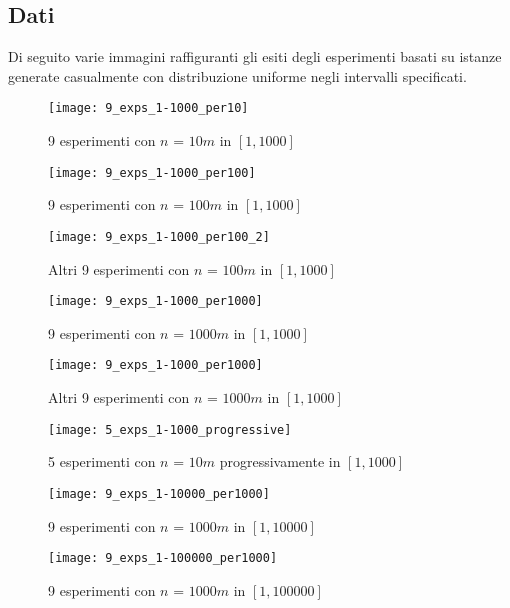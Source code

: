 \subsection{Dati}
Di seguito varie immagini raffiguranti gli esiti degli esperimenti basati su istanze generate casualmente con distribuzione uniforme negli intervalli specificati.
\begin{figure}[H]
	\caption{9 esperimenti con $ n $ = $ 10m $ in $ [1, 1000] $ }
	\label{sec:Exp1}
	\texttt{[image: 9\_exps\_1-1000\_per10]}
\end{figure}
\begin{figure}[H]
	\caption{9 esperimenti con $ n $ = $ 100m $ in $ [1, 1000] $ }
	\label{sec:Exp2}
	\texttt{[image: 9\_exps\_1-1000\_per100]}
\end{figure}
\begin{figure}[H]
	\caption{Altri 9 esperimenti con $ n $ = $ 100m $ in $ [1, 1000] $ }
	\label{sec:Exp2.2}
	\texttt{[image: 9\_exps\_1-1000\_per100\_2]}
\end{figure}
\begin{figure}[H]
	\caption{9 esperimenti con $ n $ = $ 1000m $ in $ [1, 1000] $ }
	\label{sec:Exp3}
	\texttt{[image: 9\_exps\_1-1000\_per1000]}
\end{figure}
\begin{figure}[H]
	\caption{Altri 9 esperimenti con $ n $ = $ 1000m $ in $ [1, 1000] $ }
	\label{sec:Exp3.2}
	\texttt{[image: 9\_exps\_1-1000\_per1000]}
\end{figure}
\begin{figure}[H]
	\caption{5 esperimenti con $ n $ = $ 10m $ progressivamente in $ [1, 1000] $ }
	\label{sec:Exp4}
	\texttt{[image: 5\_exps\_1-1000\_progressive]}
\end{figure}
\begin{figure}[H]
	\caption{9 esperimenti con $ n $ = $ 1000m $ in $ [1, 10000] $ }
	\label{sec:Exp5}
	\texttt{[image: 9\_exps\_1-10000\_per1000]}
\end{figure}
\begin{figure}[H]
	\caption{9 esperimenti con $ n $ = $ 1000m $ in $ [1, 100000] $ }
	\label{sec:Exp6}
	\texttt{[image: 9\_exps\_1-100000\_per1000]}
\end{figure}

